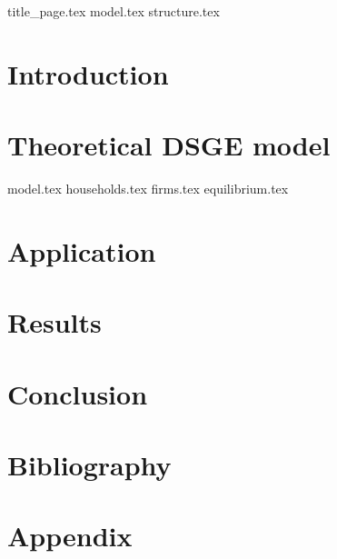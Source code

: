 \documentclass[12pt]{report}
\begin{document}
{title_page.tex}
{model.tex}
\pagebreak
{structure.tex}
\section{Introduction}

\section{Theoretical DSGE model}
{model.tex}
{households.tex}
{firms.tex}
{equilibrium.tex}
\section{Application} \label{application}
\section{Results}
\section{Conclusion}
\section{Bibliography}
\printbibliography
\section{Appendix}
\end{document}
